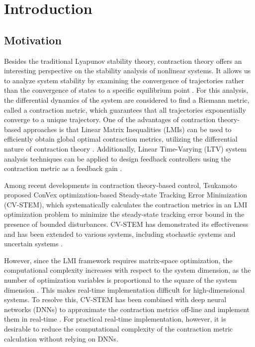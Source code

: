 \documentclass{ifacconf}
\begin{document}
\section{Introduction}

\subsection{Motivation}

Besides the traditional Lyapunov stability theory, contraction theory offers an interesting perspective on the stability analysis of nonlinear systems.
It allows us to analyze system stability by examining the convergence of trajectories rather than the convergence of states to a specific equilibrium point \cite{LOHMILLER:1998aa}.
For this analysis, the differential dynamics of the system are considered to find a Riemann metric, called a contraction metric, which guarantees that all trajectories exponentially converge to a unique trajectory.
One of the advantages of contraction theory-based approaches is that Linear Matrix Inequalities (LMIs) can be used to efficiently obtain global optimal contraction metrics, utilizing the differential nature of contraction theory \cite{Andrieu:2019aa,Manchester:2014aa}.
Additionally, Linear Time-Varying (LTV) system analysis techniques can be applied to design feedback controllers using the contraction metric as a feedback gain \cite{Tsukamoto:2019aa}.

Among recent developments in contraction theory-based control, Tsukamoto {\etal} proposed ConVex optimization-based Steady-state Tracking Error Minimization (CV-STEM), which systematically calculates the contraction metrics in an LMI optimization problem \cite{Tsukamoto:2019aa} to minimize the steady-state tracking error bound in the presence of bounded disturbances.
CV-STEM has demonstrated its effectiveness and has been extended to various systems, including stochastic systems \cite{Tsukamoto:2021ad} and uncertain systems \cite{Tsukamoto:2021af}.

However, since the LMI framework requires matrix-space optimization, the computational complexity increases with respect to the system dimension, as the number of optimization variables is proportional to the square of the system dimension \cite{Boyd:2004aa}.
This makes real-time implementation difficult for high-dimensional systems.
To resolve this, CV-STEM has been combined with deep neural networks (DNNs) to approximate the contraction metrics off-line and implement them in real-time \cite{Tsukamoto:2021ae,Tsukamoto:2021ac}.
For practical real-time implementation, however, it is desirable to reduce the computational complexity of the contraction metric calculation without relying on DNNs.
\end{document}
